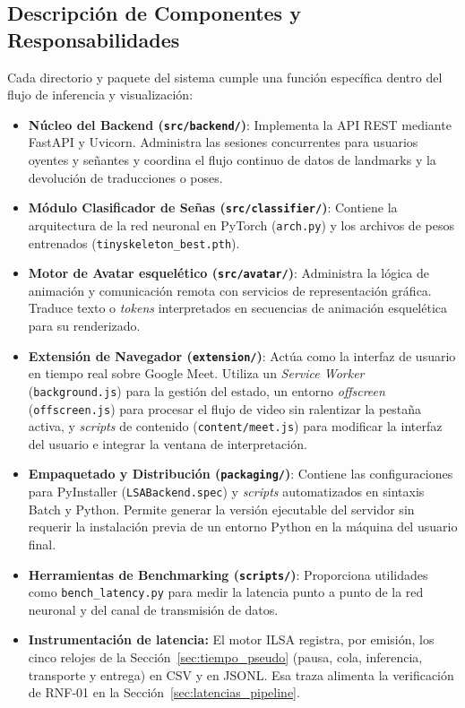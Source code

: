 \subsection{Descripción de Componentes y Responsabilidades}

Cada directorio y paquete del sistema cumple una función específica dentro del flujo de inferencia y visualización:

\begin{itemize}
    \item \textbf{Núcleo del Backend (\texttt{src/backend/})}: Implementa la API REST mediante FastAPI y Uvicorn. Administra las sesiones concurrentes para usuarios oyentes y señantes y coordina el flujo continuo de datos de landmarks y la devolución de traducciones o poses.
    
    \item \textbf{Módulo Clasificador de Señas (\texttt{src/classifier/})}: Contiene la arquitectura de la red neuronal en PyTorch (\texttt{arch.py}) y los archivos de pesos entrenados (\texttt{tinyskeleton\_best.pth}).
    
    \item \textbf{Motor de Avatar esquelético (\texttt{src/avatar/})}: Administra la lógica de animación y comunicación remota con servicios de representación gráfica. Traduce texto o \textit{tokens} interpretados en secuencias de animación esquelética para su renderizado.

    \item \textbf{Extensión de Navegador (\texttt{extension/})}: Actúa como la interfaz de usuario en tiempo real sobre Google Meet. Utiliza un \textit{Service Worker} (\texttt{background.js}) para la gestión del estado, un entorno \textit{offscreen} (\texttt{offscreen.js}) para procesar el flujo de video sin ralentizar la pestaña activa, y \textit{scripts} de contenido (\texttt{content/meet.js}) para modificar la interfaz del usuario e integrar la ventana de interpretación.

    \item \textbf{Empaquetado y Distribución (\texttt{packaging/})}: Contiene las configuraciones para PyInstaller (\texttt{LSABackend.spec}) y \textit{scripts} automatizados en sintaxis Batch y Python. Permite generar la versión ejecutable del servidor sin requerir la instalación previa de un entorno Python en la máquina del usuario final.

    \item \textbf{Herramientas de Benchmarking (\texttt{scripts/})}: Proporciona utilidades como \texttt{bench\_latency.py} para medir la latencia punto a punto de la red neuronal y del canal de transmisión de datos.
    \item \textbf{Instrumentación de latencia:} El motor ILSA registra, por emisión, los cinco relojes de la Sección~\ref{sec:tiempo_pseudo} (pausa, cola, inferencia, transporte y entrega) en CSV y en JSONL. Esa traza alimenta la verificación de RNF-01 en la Sección~\ref{sec:latencias_pipeline}.
\end{itemize}

